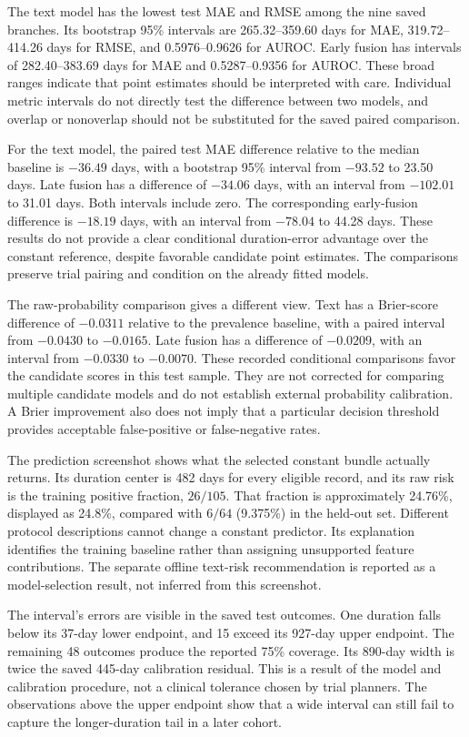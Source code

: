 \documentclass[10pt,letterpaper,twocolumn]{article}
\begin{document}
The text model has the lowest test MAE and RMSE among the nine saved branches. Its bootstrap 95\% intervals are 265.32--359.60 days for MAE, 319.72--414.26 days for RMSE, and 0.5976--0.9626 for AUROC. Early fusion has intervals of 282.40--383.69 days for MAE and 0.5287--0.9356 for AUROC. These broad ranges indicate that point estimates should be interpreted with care. Individual metric intervals do not directly test the difference between two models, and overlap or nonoverlap should not be substituted for the saved paired comparison.

For the text model, the paired test MAE difference relative to the median baseline is $-36.49$ days, with a bootstrap 95\% interval from $-93.52$ to 23.50 days. Late fusion has a difference of $-34.06$ days, with an interval from $-102.01$ to 31.01 days. Both intervals include zero. The corresponding early-fusion difference is $-18.19$ days, with an interval from $-78.04$ to 44.28 days. These results do not provide a clear conditional duration-error advantage over the constant reference, despite favorable candidate point estimates. The comparisons preserve trial pairing and condition on the already fitted models.

The raw-probability comparison gives a different view. Text has a Brier-score difference of $-0.0311$ relative to the prevalence baseline, with a paired interval from $-0.0430$ to $-0.0165$. Late fusion has a difference of $-0.0209$, with an interval from $-0.0330$ to $-0.0070$. These recorded conditional comparisons favor the candidate scores in this test sample. They are not corrected for comparing multiple candidate models and do not establish external probability calibration. A Brier improvement also does not imply that a particular decision threshold provides acceptable false-positive or false-negative rates.

The prediction screenshot shows what the selected constant bundle actually returns. Its duration center is 482 days for every eligible record, and its raw risk is the training positive fraction, $26/105$. That fraction is approximately 24.76\%, displayed as 24.8\%, compared with $6/64$ (9.375\%) in the held-out set. Different protocol descriptions cannot change a constant predictor. Its explanation identifies the training baseline rather than assigning unsupported feature contributions. The separate offline text-risk recommendation is reported as a model-selection result, not inferred from this screenshot.

The interval's errors are visible in the saved test outcomes. One duration falls below its 37-day lower endpoint, and 15 exceed its 927-day upper endpoint. The remaining 48 outcomes produce the reported 75\% coverage. Its 890-day width is twice the saved 445-day calibration residual. This is a result of the model and calibration procedure, not a clinical tolerance chosen by trial planners. The observations above the upper endpoint show that a wide interval can still fail to capture the longer-duration tail in a later cohort.
\end{document}
